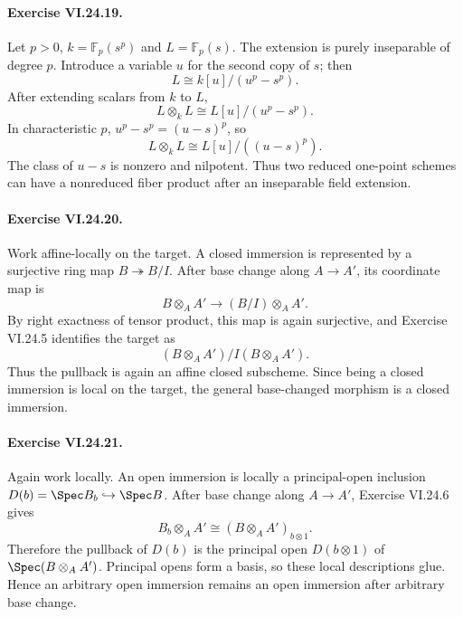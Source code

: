 \paragraph{Exercise VI.24.19.}
\begin{solution}
Let $p>0$, $k=\mathbb F_p(s^p)$ and $L=\mathbb F_p(s)$.  The extension is purely inseparable of
degree $p$.  Introduce a variable $u$ for the second copy of $s$; then
\[
L\cong k[u]/(u^p-s^p).
\]
After extending scalars from $k$ to $L$,
\[
L\otimes_kL\cong L[u]/(u^p-s^p).
\]
In characteristic $p$, $u^p-s^p=(u-s)^p$, so
\[
L\otimes_kL\cong L[u]/((u-s)^p).
\]
The class of $u-s$ is nonzero and nilpotent.  Thus two reduced one-point schemes can have a
nonreduced fiber product after an inseparable field extension.
\end{solution}

\paragraph{Exercise VI.24.20.}
\begin{solution}
Work affine-locally on the target.  A closed immersion is represented by a surjective ring map
$B\twoheadrightarrow B/I$.  After base change along $A\to A'$, its coordinate map is
\[
B\otimes_AA'\longrightarrow(B/I)\otimes_AA'.
\]
By right exactness of tensor product, this map is again surjective, and Exercise VI.24.5 identifies
the target as
\[
(B\otimes_AA')/I(B\otimes_AA').
\]
Thus the pullback is again an affine closed subscheme.  Since being a closed immersion is local on
the target, the general base-changed morphism is a closed immersion.
\end{solution}

\paragraph{Exercise VI.24.21.}
\begin{solution}
Again work locally.  An open immersion is locally a principal-open inclusion
$D(b)=\Spec B_b\hookrightarrow\Spec B$.  After base change along $A\to A'$, Exercise VI.24.6 gives
\[
B_b\otimes_AA'\cong(B\otimes_AA')_{b\otimes1}.
\]
Therefore the pullback of $D(b)$ is the principal open $D(b\otimes1)$ of
$\Spec(B\otimes_AA')$.  Principal opens form a basis, so these local descriptions glue.  Hence an
arbitrary open immersion remains an open immersion after arbitrary base change.
\end{solution}

